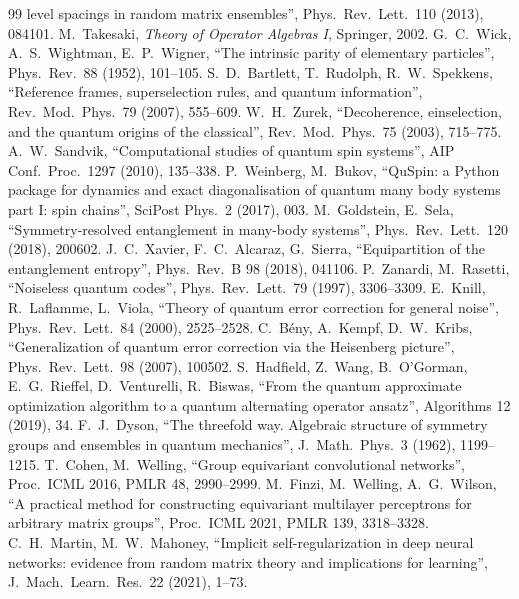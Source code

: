 \documentclass[11pt]{article}
\begin{document}
{\begin{thebibliography}{99}
  level spacings in random matrix ensembles'', Phys.\ Rev.\ Lett.\ 110 (2013), 084101.
 M.~Takesaki, \emph{Theory of Operator Algebras I}, Springer, 2002.
 G.~C.~Wick, A.~S.~Wightman, E.~P.~Wigner, ``The intrinsic parity of elementary particles'',
  Phys.\ Rev.\ 88 (1952), 101--105.
 S.~D.~Bartlett, T.~Rudolph, R.~W.~Spekkens, ``Reference frames, superselection rules, and
  quantum information'', Rev.\ Mod.\ Phys.\ 79 (2007), 555--609.
 W.~H.~Zurek, ``Decoherence, einselection, and the quantum origins of the classical'',
  Rev.\ Mod.\ Phys.\ 75 (2003), 715--775.
 A.~W.~Sandvik, ``Computational studies of quantum spin systems'', AIP Conf.\ Proc.\ 1297
  (2010), 135--338.
 P.~Weinberg, M.~Bukov, ``QuSpin: a Python package for dynamics and exact diagonalisation of
  quantum many body systems part I: spin chains'', SciPost Phys.\ 2 (2017), 003.
 M.~Goldstein, E.~Sela, ``Symmetry-resolved entanglement in many-body systems'',
  Phys.\ Rev.\ Lett.\ 120 (2018), 200602.
 J.~C.~Xavier, F.~C.~Alcaraz, G.~Sierra, ``Equipartition of the entanglement entropy'',
  Phys.\ Rev.\ B 98 (2018), 041106.
 P.~Zanardi, M.~Rasetti, ``Noiseless quantum codes'', Phys.\ Rev.\ Lett.\ 79 (1997), 3306--3309.
 E.~Knill, R.~Laflamme, L.~Viola, ``Theory of quantum error correction for general noise'',
  Phys.\ Rev.\ Lett.\ 84 (2000), 2525--2528.
 C.~B\'eny, A.~Kempf, D.~W.~Kribs, ``Generalization of quantum error correction via the Heisenberg
  picture'', Phys.\ Rev.\ Lett.\ 98 (2007), 100502.
 S.~Hadfield, Z.~Wang, B.~O'Gorman, E.~G.~Rieffel, D.~Venturelli, R.~Biswas, ``From the quantum
  approximate optimization algorithm to a quantum alternating operator ansatz'', Algorithms 12 (2019), 34.
 F.~J.~Dyson, ``The threefold way. Algebraic structure of symmetry groups and ensembles in quantum
  mechanics'', J.\ Math.\ Phys.\ 3 (1962), 1199--1215.
 T.~Cohen, M.~Welling, ``Group equivariant convolutional networks'', Proc.\ ICML 2016, PMLR 48,
  2990--2999.
 M.~Finzi, M.~Welling, A.~G.~Wilson, ``A practical method for constructing equivariant multilayer
  perceptrons for arbitrary matrix groups'', Proc.\ ICML 2021, PMLR 139, 3318--3328.
 C.~H.~Martin, M.~W.~Mahoney, ``Implicit self-regularization in deep neural networks: evidence from
  random matrix theory and implications for learning'', J.\ Mach.\ Learn.\ Res.\ 22 (2021), 1--73.

\end{thebibliography}}
\end{document}
